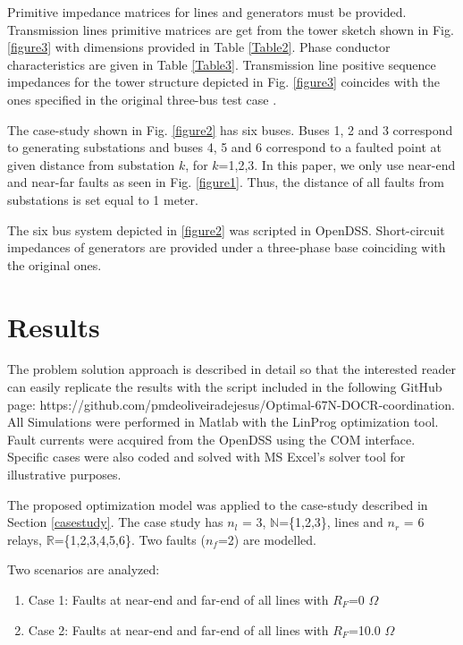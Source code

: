 \documentclass[letterpaper, 10 pt, conference]{IEEEtran}
\begin{document}
        
Primitive impedance matrices  for lines and generators must be provided. Transmission lines primitive matrices are get from the tower sketch shown in Fig. \ref{figure3} with dimensions provided in Table \ref{Table2}. Phase conductor characteristics are given in
Table  \ref{Table3}. Transmission line positive sequence impedances for the tower structure depicted in   Fig. \ref{figure3} coincides with the ones specified in the original three-bus test case \cite{urdaneta1988}.






The case-study shown in Fig. \ref{figure2} has six buses. Buses 1, 2 and 3 correspond to generating substations and buses 4, 5 and 6 correspond to a faulted point at given distance from substation $k$, for $k$=1,2,3. In this paper, we only use near-end and near-far faults as seen in  Fig. \ref{figure1}. Thus, the distance of all faults from substations is set equal to 1 meter.


The six bus system depicted in  \ref{figure2} was scripted in OpenDSS. Short-circuit impedances of generators are provided under a three-phase base coinciding with the original ones.




  \section{Results}  \label{results}

The problem solution approach is described in detail so that the interested reader can easily replicate the results with the script included in the following GitHub page: https://github.com/pmdeoliveiradejesus/Optimal-67N-DOCR-coordination. All Simulations were performed in Matlab with the LinProg optimization tool. Fault currents were acquired from the OpenDSS using the COM interface. Specific cases were also coded and solved with MS Excel's solver tool for illustrative purposes.


  The proposed optimization model was applied to the case-study described in Section \ref{casestudy}.
    The case study has $n_l$ = 3, $\mathds{N}$=\{1,2,3\}, lines and $n_r$ = 6 relays,
      $\mathds{R}$=\{1,2,3,4,5,6\}. Two faults ($n_f$=2) are modelled.


      Two scenarios are analyzed:
\begin{enumerate}
  \item Case 1: Faults at near-end and far-end of all lines with $R_F$=0 $\Omega$
  \item Case 2: Faults at near-end and far-end of all lines with $R_F$=10.0 $\Omega$
\end{enumerate}
\end{document}
